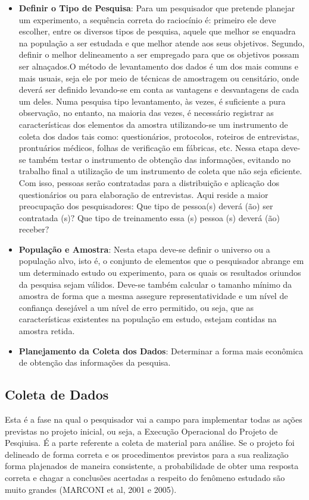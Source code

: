 \begin{itemize}
\item \textbf{Definir o Tipo de Pesquisa}: Para um pesquisador que pretende planejar um experimento, a sequência correta do raciocínio é: primeiro ele deve escolher, entre os diversos tipos de pesquisa, aquele que melhor se enquadra na população a ser estudada e que melhor atende aos seus objetivos. Segundo, definir o melhor delineamento a ser empregado para que os objetivos possam ser alnaçados.O método de levantamento dos dados é um dos mais comuns e mais usuais, seja ele por meio de técnicas de amostragem ou censitário, onde deverá ser definido levando-se em conta as vantagens e desvantagens de cada um deles. Numa pesquisa tipo levantamento, às vezes, é suficiente a pura observação, no entanto, na maioria das vezes, é necessário registrar as características dos elementos da amostra utilizando-se um instrumento de coleta dos dados tais como: questionários, protocolos, roteiros de entrevistas, prontuários médicos, folhas de verificação em fábricas, etc. Nessa etapa deve-se também testar o instrumento de obtenção das informações, evitando no trabalho final a utilização de um instrumento de coleta que não seja eficiente. Com isso, pessoas serão contratadas para a distribuição e aplicação dos questionários ou para elaboração de entrevistas. Aqui reside a maior preocupação dos pesquisadores: Que tipo de pessoa(s) deverá (ão) ser contratada (s)$?$ Que tipo de treinamento essa (s) pessoa (s) deverá (ão) receber$?$
   \item \textbf{População e Amostra}: Nesta etapa deve-se definir o universo ou a população alvo, isto é, o conjunto de elementos que o pesquisador abrange em um determinado estudo ou experimento, para os quais os resultados oriundos da pesquisa sejam válidos. Deve-se também calcular o tamanho mínimo da amostra de forma que a mesma assegure representatividade e um nível de confiança desejável a um nível de erro permitido, ou seja, que as características existentes na população em estudo, estejam contidas na amostra retida.
   \item \textbf{Planejamento da Coleta dos Dados}: Determinar a forma mais e\-co\-nô\-mi\-ca de obtenção das informações da pesquisa.
 \end{itemize}


\subsection{Coleta de Dados}

\inic Esta é a fase na qual o pesquisador vai a campo para implementar
todas as ações previstas no projeto inicial, ou seja, a Execução Operacional do Projeto de Pesqiuisa. É a parte referente a
coleta de material para análise. Se o projeto foi delineado de
forma correta e os procedimentos previstos para a sua realização
forma plajenados de maneira consistente, a probabilidade de obter
uma resposta correta e chagar a conclusões acertadas a respeito do
fenômeno estudado são muito grandes (MARCONI et al, 2001 e 2005).\vskip0.3cm


